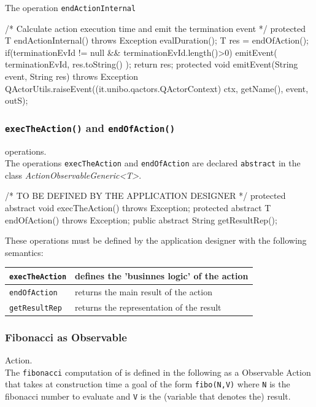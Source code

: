 The operation \texttt{endActionInternal} 
\begin{javacode}
 	/* Calculate action execution time and emit the termination event */
	protected T endActionInternal() throws Exception{
		evalDuration();
		T res = endOfAction();		
		if(terminationEvId != null && terminationEvId.length()>0) {
 			emitEvent( terminationEvId, res.toString() );
		}
		return res;
	}
	protected void emitEvent(String event, String res) throws Exception{
     	QActorUtils.raiseEvent((it.unibo.qactors.QActorContext) ctx, getName(), event, outS);		
	} 
\end{javacode}

\subsubsection{\texttt{execTheAction()} and  \texttt{endOfAction()}} operations.\\
The operations \texttt{execTheAction} and \texttt{endOfAction} are declared \texttt{abstract} in the class \textit{ActionObservableGeneric<T>}. 

\begin{javacode}
	/* TO BE DEFINED BY THE APPLICATION DESIGNER */
	protected abstract void execTheAction() throws Exception; 
	protected abstract T endOfAction() throws Exception; 
	public abstract String getResultRep();
\end{javacode}

These operations must be defined by the application designer with the following semantics:

\medskip 
\begin{tabular}{|l|l|}
\hline 
\texttt{execTheAction} & defines the 'businnes logic' of the action \\ 
\hline 
\texttt{endOfAction} & returns the main result of the action \\ 
\hline 
\texttt{getResultRep} & returns the representation of the result \\ 
\hline 
\end{tabular} 
 
\subsubsection{Fibonacci as Observable} Action.\\
The \texttt{fibonacci} computation of  is defined in the following as a Observable Action that takes at construction time a goal of the form \texttt{fibo(N,V)} where \texttt{N} is the fibonacci number to evaluate and \texttt{V} is the (variable that denotes the) result.

